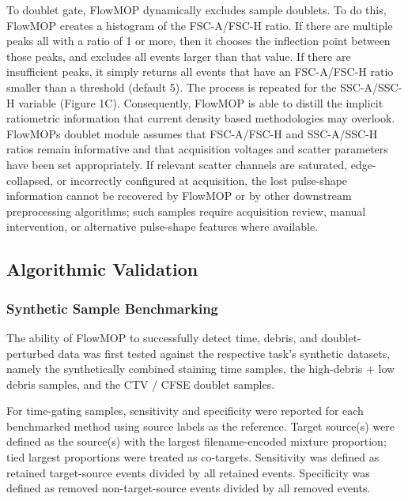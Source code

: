 \documentclass[ASNA]{latex/wiley/USG}
\begin{document}
To doublet gate, FlowMOP dynamically excludes sample doublets. To do
this, FlowMOP creates a histogram of the FSC-A/FSC-H ratio. If there are
multiple peaks all with a ratio of 1 or more, then it chooses the
inflection point between those peaks, and excludes all events larger
than that value. If there are insufficient peaks, it simply returns all
events that have an FSC-A/FSC-H ratio smaller than a threshold (default
5). The process is repeated for the SSC-A/SSC-H
variable{\color{revisionblue} (Figure 1C)}. Consequently, FlowMOP is
able to distill the implicit ratiometric information that current
density based methodologies may overlook. FlowMOP\textquotesingle s
doublet module assumes that FSC-A/FSC-H and SSC-A/SSC-H ratios remain
informative and that acquisition voltages and scatter parameters have
been set appropriately. If relevant scatter channels are saturated,
edge-collapsed, or incorrectly configured at acquisition, the lost
pulse-shape information cannot be recovered by FlowMOP or by other
downstream preprocessing algorithms; such samples require acquisition
review, manual intervention, or alternative pulse-shape features where
available.

\subsection{Algorithmic Validation}\label{algorithmic-validation}

\subsubsection{Synthetic Sample
Benchmarking}\label{synthetic-sample-benchmarking}

The ability of FlowMOP to successfully detect time, debris, and
doublet-perturbed data was first tested against the respective task's
synthetic datasets, namely the synthetically combined staining time
samples, the high-debris + low debris samples, and the CTV / CFSE
doublet samples.

For time-gating samples, sensitivity and specificity were reported for
each benchmarked method using source labels as the reference. Target
source(s) were defined as the source(s) with the largest
filename-encoded mixture proportion; tied largest proportions were
treated as co-targets. Sensitivity was defined as retained target-source
events divided by all retained events. Specificity was defined as
removed non-target-source events divided by all removed events.
\end{document}
